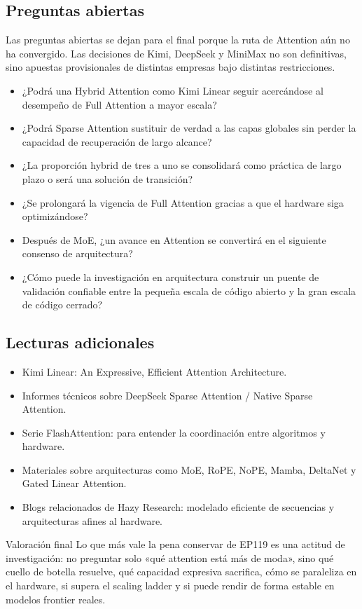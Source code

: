 \documentclass[a4paper]{article}
\begin{document}
\subsection{Preguntas abiertas}

Las preguntas abiertas se dejan para el final porque la ruta de Attention aún no ha convergido. Las decisiones de Kimi, DeepSeek y MiniMax no son definitivas, sino apuestas provisionales de distintas empresas bajo distintas restricciones.

\begin{itemize}
\item ¿Podrá una Hybrid Attention como Kimi Linear seguir acercándose al desempeño de Full Attention a mayor escala?
\item ¿Podrá Sparse Attention sustituir de verdad a las capas globales sin perder la capacidad de recuperación de largo alcance?
\item ¿La proporción hybrid de tres a uno se consolidará como práctica de largo plazo o será una solución de transición?
\item ¿Se prolongará la vigencia de Full Attention gracias a que el hardware siga optimizándose?
\item Después de MoE, ¿un avance en Attention se convertirá en el siguiente consenso de arquitectura?
\item ¿Cómo puede la investigación en arquitectura construir un puente de validación confiable entre la pequeña escala de código abierto y la gran escala de código cerrado?
\end{itemize}

\subsection{Lecturas adicionales}

\begin{itemize}
\item Kimi Linear: An Expressive, Efficient Attention Architecture.
\item Informes técnicos sobre DeepSeek Sparse Attention / Native Sparse Attention.
\item Serie FlashAttention: para entender la coordinación entre algoritmos y hardware.
\item Materiales sobre arquitecturas como MoE, RoPE, NoPE, Mamba, DeltaNet y Gated Linear Attention.
\item Blogs relacionados de Hazy Research: modelado eficiente de secuencias y arquitecturas afines al hardware.
\end{itemize}

\begin{importantbox}{Valoración final}
Lo que más vale la pena conservar de EP119 es una actitud de investigación: no preguntar solo «qué attention está más de moda», sino qué cuello de botella resuelve, qué capacidad expresiva sacrifica, cómo se paraleliza en el hardware, si supera el scaling ladder y si puede rendir de forma estable en modelos frontier reales.
\end{importantbox}
\end{document}
